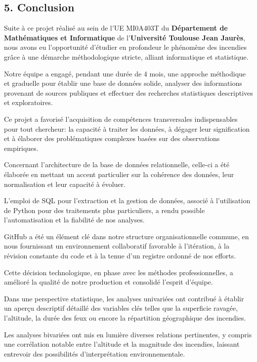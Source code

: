 \documentclass[
]{article}
\begin{document}
\subsection{5. Conclusion}\label{conclusion}

Suite à ce projet réalisé au sein de l'UE MI0A403T du
\textbf{Département de Mathématiques et Informatique} de
l'\textbf{Université Toulouse Jean Jaurès}, nous avons eu l'opportunité
d'étudier en profondeur le phénomène des incendies grâce à une démarche
méthodologique stricte, alliant informatique et statistique.

Notre équipe a engagé, pendant une durée de 4 mois, une approche
méthodique et graduelle pour établir une base de données solide,
analyser des informations provenant de sources publiques et effectuer
des recherches statistiques descriptives et exploratoires.

Ce projet a favorisé l'acquisition de compétences transversales
indispensables pour tout chercheur: la capacité à traiter les données, à
dégager leur signification et à élaborer des problématiques complexes
basées sur des observations empiriques.

Concernant l'architecture de la base de données relationnelle, celle-ci
a été élaborée en mettant un accent particulier sur la cohérence des
données, leur normalisation et leur capacité à évoluer.

L'emploi de SQL pour l'extraction et la gestion de données, associé à
l'utilisation de Python pour des traitements plus particuliers, a rendu
possible l'automatisation et la fiabilité de nos analyses.

GitHub a été un élément clé dans notre structure organisationnelle
commune, en nous fournissant un environnement collaboratif favorable à
l'itération, à la révision constante du code et à la tenue d'un registre
ordonné de nos efforts.

Cette décision technologique, en phase avec les méthodes
professionnelles, a amélioré la qualité de notre production et consolidé
l'esprit d'équipe.

Dans une perspective statistique, les analyses univariées ont contribué
à établir un aperçu descriptif détaillé des variables clés telles que la
superficie ravagée, l'altitude, la durée des feux ou encore la
répartition géographique des incendies.

Les analyses bivariées ont mis en lumière diverses relations
pertinentes, y compris une corrélation notable entre l'altitude et la
magnitude des incendies, laissant entrevoir des possibilités
d'interprétation environnementale.
\end{document}
